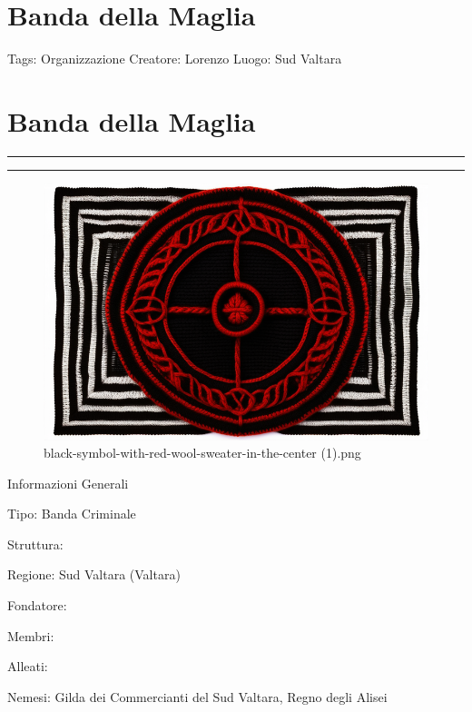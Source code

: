 \section{Banda della Maglia}\label{banda-della-maglia}

Tags: Organizzazione Creatore: Lorenzo Luogo: Sud Valtara

\section{Banda della Maglia}\label{banda-della-maglia-1}

\begin{center}\rule{0.5\linewidth}{0.5pt}\end{center}

\begin{center}\rule{0.5\linewidth}{0.5pt}\end{center}

\begin{figure}
\centering
\includegraphics{black-symbol-with-red-wool-sweater-in-the-center_(1).png}
\caption{black-symbol-with-red-wool-sweater-in-the-center (1).png}
\end{figure}

Informazioni Generali

Tipo: Banda Criminale

Struttura:

Regione: Sud Valtara (Valtara)

Fondatore:

Membri:

Alleati:

Nemesi: Gilda dei Commercianti del Sud Valtara, Regno degli Alisei

